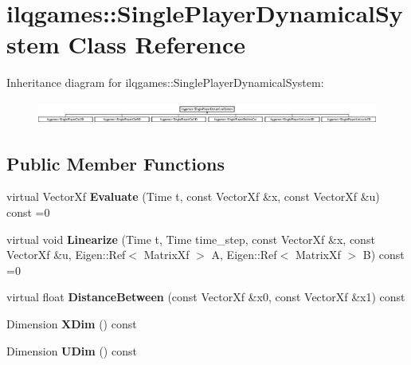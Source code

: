 \hypertarget{classilqgames_1_1_single_player_dynamical_system}{}\section{ilqgames\+:\+:Single\+Player\+Dynamical\+System Class Reference}
\label{classilqgames_1_1_single_player_dynamical_system}
Inheritance diagram for ilqgames\+:\+:Single\+Player\+Dynamical\+System\+:\begin{figure}[H]
\begin{center}
\leavevmode
\includegraphics[height=0.761905cm]{classilqgames_1_1_single_player_dynamical_system}
\end{center}
\end{figure}
\subsection*{Public Member Functions}
\begin{DoxyCompactItemize}
\item 
virtual Vector\+Xf {\bfseries Evaluate} (Time t, const Vector\+Xf \&x, const Vector\+Xf \&u) const =0\hypertarget{classilqgames_1_1_single_player_dynamical_system_a6a6fdd6eaf0fd0171d8f87a1648e3320}{}\label{classilqgames_1_1_single_player_dynamical_system_a6a6fdd6eaf0fd0171d8f87a1648e3320}

\item 
virtual void {\bfseries Linearize} (Time t, Time time\+\_\+step, const Vector\+Xf \&x, const Vector\+Xf \&u, Eigen\+::\+Ref$<$ Matrix\+Xf $>$ A, Eigen\+::\+Ref$<$ Matrix\+Xf $>$ B) const =0\hypertarget{classilqgames_1_1_single_player_dynamical_system_a910d13c85415769ba434e6b423390fc9}{}\label{classilqgames_1_1_single_player_dynamical_system_a910d13c85415769ba434e6b423390fc9}

\item 
virtual float {\bfseries Distance\+Between} (const Vector\+Xf \&x0, const Vector\+Xf \&x1) const \hypertarget{classilqgames_1_1_single_player_dynamical_system_a2487c7603c1dc998799c0227d00904f3}{}\label{classilqgames_1_1_single_player_dynamical_system_a2487c7603c1dc998799c0227d00904f3}

\item 
Dimension {\bfseries X\+Dim} () const \hypertarget{classilqgames_1_1_single_player_dynamical_system_a54b50acd4d8eb613c5f1042e38a5f6fd}{}\label{classilqgames_1_1_single_player_dynamical_system_a54b50acd4d8eb613c5f1042e38a5f6fd}

\item 
Dimension {\bfseries U\+Dim} () const \hypertarget{classilqgames_1_1_single_player_dynamical_system_a24d4db1d3ad5450108eb22c412e606c1}{}\label{classilqgames_1_1_single_player_dynamical_system_a24d4db1d3ad5450108eb22c412e606c1}

\end{DoxyCompactItemize}
